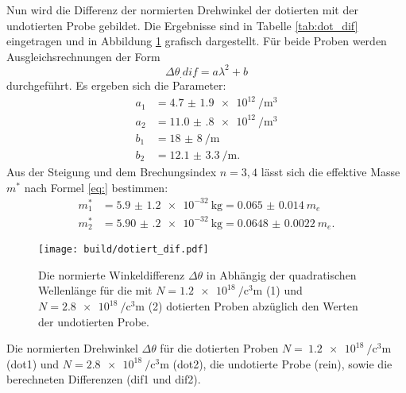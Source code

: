 Nun wird die Differenz der normierten Drehwinkel der dotierten mit der undotierten Probe gebildet. Die Ergebnisse sind in Tabelle \ref{tab:dot_dif} eingetragen und in Abbildung \ref{fig:dot_dif} grafisch dargestellt.
Für beide Proben werden Ausgleichsrechnungen der Form
\[
\Delta\theta_.{dif}=a\lambda^2+b
\] 
durchgeführt.
Es ergeben sich die Parameter:
\begin{align*}
a_1 &= \SI{4.7(19)e12}{\per\cubic\metre}\\
a_2 &= \SI{11.0(8)e12}{\per\cubic\metre}\\
b_1 &= \SI{18(8)}{\per\metre}\\
b_2 &= \SI{12.1(33)}{\per\metre}\text{.}
\end{align*}
Aus der Steigung und dem Brechungsindex $n=3,4$ \cite{} lässt sich die effektive Masse $m^*$ nach Formel \eqref{eq:} bestimmen:
\begin{align*}
m^*_1 &= \SI{5.9(12)e-32}{\kilogram} = \SI{0.065(14)}{m_e}\\
m^*_2 &= \SI{5.90(20)e-32}{\kilogram} = \SI{0.0648(22)}{m_e}\text{.}
\end{align*}

\begin{figure}
	\centering
	\texttt{[image: build/dotiert\_dif.pdf]}
	\caption{Die normierte Winkeldifferenz $\Delta\theta$ in Abhängig der quadratischen Wellenlänge für die mit $N=\SI{1.2e18}{\per\cubic\centi\metre}$ (1) und $N=\SI{2.8e18}{\per\cubic\centi\metre}$ (2) dotierten Proben abzüglich den Werten der undotierten Probe.}
	\label{fig:dot_dif}
\end{figure}

\begin{table}
	\centering
	\caption{Die normierten Drehwinkel $\Delta\theta$ für die dotierten Proben $N=~\SI{1.2e18}{\per\cubic\centi\metre}$ (dot1) und $N=\SI{2.8e18}{\per\cubic\centi\metre}$ (dot2), die undotierte Probe (rein), sowie die berechneten Differenzen (dif1 und dif2).}
	
	\label{tab:dot_dif}
\end{table}
